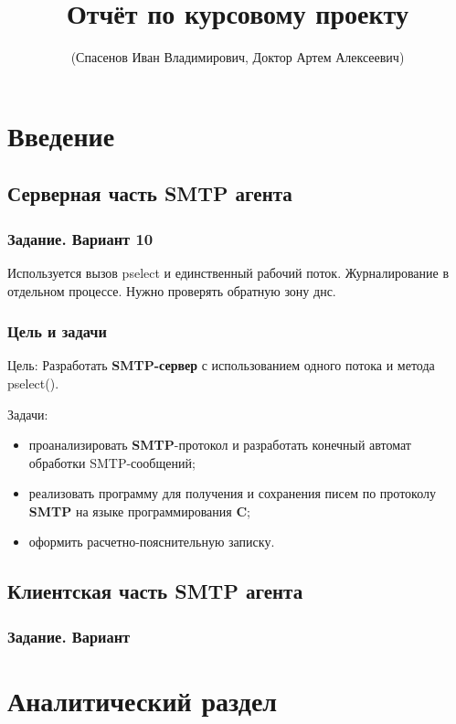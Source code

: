\documentclass[a4paper,12pt]{report}
\title{Отчёт по курсовому проекту }
\author{(Спасенов Иван Владимирович, Доктор Артем Алексеевич)}
\begin{document}
\maketitle

\tableofcontents

\chapter*{Введение}

\section*{Серверная часть SMTP агента}

\subsection*{Задание. Вариант 10}

Используется вызов pselect и единственный рабочий поток. Журналирование в отдельном процессе. Нужно проверять обратную зону днс.

\subsection*{Цель и задачи}

Цель:
    Разработать \textbf{SMTP-сервер} с использованием одного потока и метода pselect().

Задачи:
\begin{itemize}
    \item проанализировать \textbf{SMTP}-протокол и разработать конечный автомат обработки SMTP-сообщений;
    \item реализовать программу для получения и сохранения писем по протоколу \textbf{SMTP} на языке программирования \textbf{C};
    \item оформить расчетно-пояснительную записку.
\end{itemize}

\section*{Клиентская часть SMTP агента}

\subsection*{Задание. Вариант }


\chapter{Аналитический раздел}
\end{document}
